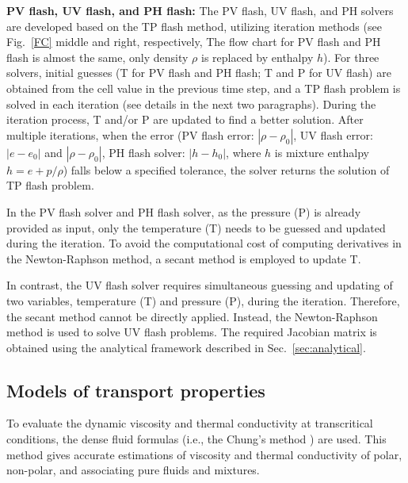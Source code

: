 \textbf{PV flash, UV flash, and PH flash:}
The PV flash, UV flash, and PH solvers are developed based on the TP flash method, utilizing iteration methods (see Fig.~\ref{FC} middle and right, respectively, The flow chart for PV flash and PH flash is almost the same, only density $\rho$ is replaced by enthalpy $h$). For three solvers, initial guesses (T for PV flash and PH flash; T and P for UV flash) are obtained from the cell value in the previous time step, and a TP flash problem is solved in each iteration (see details in the next two paragraphs). During the iteration process, T and/or P are updated to find a better solution. After multiple iterations, when the error (PV flash error: $|\rho - \rho_0|$, UV flash error: $|e - e_0|$ and $|\rho - \rho_0|$, PH flash solver: $|h - h_0|$, where $h$ is mixture enthalpy $h=e+p/\rho$) falls below a specified tolerance, the solver returns the solution of TP flash problem.


In the PV flash solver and PH flash solver, as the pressure (P) is already provided as input, only the temperature (T) needs to be guessed and updated during the iteration. To avoid the computational cost of computing derivatives in the Newton-Raphson method, a secant method is employed to update T.


In contrast, the UV flash solver requires simultaneous guessing and updating of two variables,  temperature (T) and pressure (P), during the iteration. Therefore, the secant method cannot be directly applied. Instead, the Newton-Raphson method is used to solve UV flash problems. The required Jacobian matrix is obtained using the analytical framework described in Sec.~\ref{sec:analytical}.



\subsection{Models of transport properties}
To evaluate the dynamic viscosity and thermal conductivity at transcritical conditions, the dense fluid formulas (i.e., the Chung's method \cite{chung1988generalized}) are used. This method gives accurate estimations of viscosity and thermal conductivity of polar, non-polar, and associating pure fluids and mixtures.
